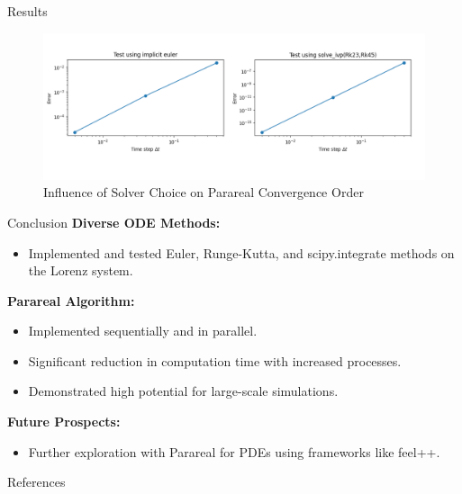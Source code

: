 \documentclass[aspectratio=169,xcolor=dvipsnames, t]{beamer}
\begin{document}
\begin{frame}{Results}
    \begin{figure}[ht!]
    \centering
    \includegraphics[width=1\textwidth]{figures/order_converge.png}
    \caption{Influence of Solver Choice on Parareal Convergence Order}
    \label{fig:9}
\end{figure}
\end{frame}

\begin{frame}{Conclusion}
\textbf{Diverse ODE Methods:}
\begin{itemize}
    \item Implemented and tested Euler, Runge-Kutta, and scipy.integrate methods on the Lorenz system.
\end{itemize}
\textbf{Parareal Algorithm:}
\begin{itemize}
    \item Implemented sequentially and in parallel.
    \item Significant reduction in computation time with increased processes.
    \item Demonstrated high potential for large-scale simulations.
\end{itemize}
\textbf{Future Prospects:}
\begin{itemize}
    \item Further exploration with Parareal for PDEs using frameworks like feel++.
\end{itemize}
\end{frame}

\begin{frame}[allowframebreaks]{References}
    \printbibliography
	
\end{frame}

\makefinalpage
\end{document}
